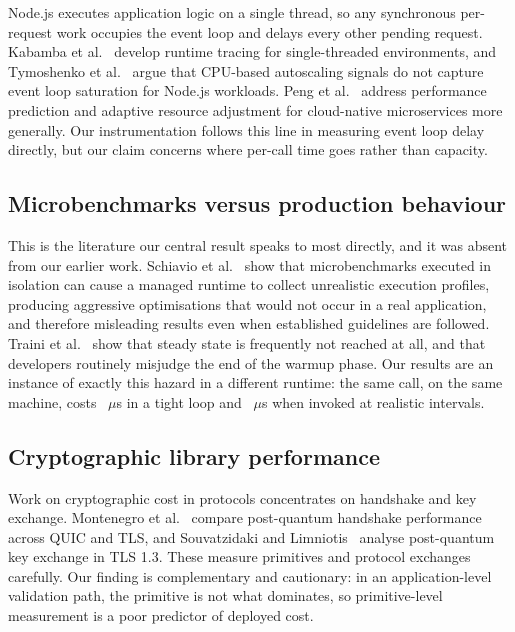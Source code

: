 \documentclass[pdflatex,sn-basic,twocolumn]{sn-jnl}
\begin{document}
Node.js executes application logic on a single thread, so any synchronous
per-request work occupies the event loop and delays every other pending request.
Kabamba et al.~\cite{kabamba2026nodecompass} develop runtime tracing for
single-threaded environments, and Tymoshenko et
al.~\cite{tymoshenko2026predictive} argue that CPU-based autoscaling signals do
not capture event loop saturation for Node.js workloads. Peng et
al.~\cite{peng2025performance} address performance prediction and adaptive
resource adjustment for cloud-native microservices more generally. Our
instrumentation follows this line in measuring event loop delay directly, but
our claim concerns where per-call time goes rather than capacity.

\subsection{Microbenchmarks versus production behaviour}

This is the literature our central result speaks to most directly, and it was
absent from our earlier work. Schiavio et al.~\cite{schiavio2026misleading} show
that microbenchmarks executed in isolation can cause a managed runtime to
collect unrealistic execution profiles, producing aggressive optimisations that
would not occur in a real application, and therefore misleading results even
when established guidelines are followed. Traini et
al.~\cite{traini2022steady} show that steady state is frequently not reached at
all, and that developers routinely misjudge the end of the warmup phase. Our
results are an instance of exactly this hazard in a different runtime: the same
call, on the same machine, costs \TightPreparsed~$\mu$s in a tight loop and
\GapTwoHundredMsPreparsed~$\mu$s when invoked at realistic intervals.

\subsection{Cryptographic library performance}

Work on cryptographic cost in protocols concentrates on handshake and key
exchange. Montenegro et al.~\cite{montenegro2026postquantum} compare
post-quantum handshake performance across QUIC and TLS, and Souvatzidaki and
Limniotis~\cite{souvatzidaki2025pqtls} analyse post-quantum key exchange in TLS
1.3. These measure primitives and protocol exchanges carefully. Our finding is
complementary and cautionary: in an application-level validation path, the
primitive is not what dominates, so primitive-level measurement is a poor
predictor of deployed cost.
\end{document}
